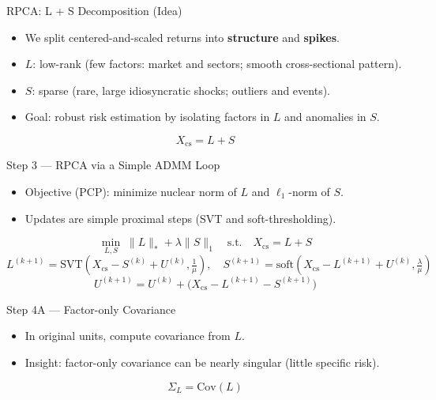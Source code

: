 \documentclass[aspectratio=169]{beamer}
\begin{document}
	\begin{frame}{RPCA: L + S Decomposition (Idea)}
		\small
		\begin{itemize}
			\item We split centered-and-scaled returns into \textbf{structure} and \textbf{spikes}.
			\item $L$: low-rank (few factors: market and sectors; smooth cross-sectional pattern).
			\item $S$: sparse (rare, large idiosyncratic shocks; outliers and events).
			\item Goal: robust risk estimation by isolating factors in $L$ and anomalies in $S$.
		\end{itemize}
		\begin{equation*}
			X_{\mathrm{cs}} = L + S
		\end{equation*}
	\end{frame}
	
	\begin{frame}{Step 3 — RPCA via a Simple ADMM Loop}
		\small
		\begin{itemize}
			\item Objective (PCP): minimize nuclear norm of $L$ and $\ell_1$-norm of $S$.
			\item Updates are simple proximal steps (SVT and soft-thresholding).
		\end{itemize}
		\begin{equation*}
			\min_{L,S}\; \|L\|_{\ast} + \lambda \|S\|_{1} \quad \text{s.t.}\quad X_{\mathrm{cs}} = L + S
		\end{equation*}
		\begin{equation*}
			L^{(k+1)} = \mathrm{SVT}\!\left(X_{\mathrm{cs}} - S^{(k)} + U^{(k)}, \tfrac{1}{\mu}\right),\quad
			S^{(k+1)} = \mathrm{soft}\!\left(X_{\mathrm{cs}} - L^{(k+1)} + U^{(k)}, \tfrac{\lambda}{\mu}\right)
		\end{equation*}
		\begin{equation*}
			U^{(k+1)} = U^{(k)} + \big(X_{\mathrm{cs}} - L^{(k+1)} - S^{(k+1)}\big)
		\end{equation*}
	\end{frame}
	
	\begin{frame}{Step 4A — Factor-only Covariance}
		\small
		\begin{itemize}
			\item In original units, compute covariance from $L$.
			\item Insight: factor-only covariance can be nearly singular (little specific risk).
		\end{itemize}
		\begin{equation*}
			\Sigma_{L} = \mathrm{Cov}(L)
		\end{equation*}
	\end{frame}
	
\end{document}
